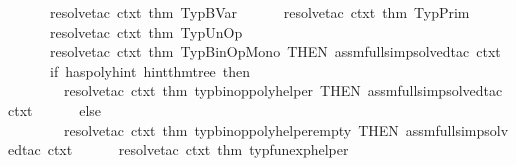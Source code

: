 \begin{isabellebody}
\ \ \ \ \ \ resolve{\isacharunderscore}{\kern0pt}tac\ ctxt\ {\isacharbrackleft}{\kern0pt}{\isacharat}{\kern0pt}{\isacharbraceleft}{\kern0pt}thm\ TypBVar{\isacharbraceright}{\kern0pt}{\isacharbrackright}{\kern0pt}{\isacharcomma}{\kern0pt}\isanewline
\ \ \ \ \ \ resolve{\isacharunderscore}{\kern0pt}tac\ ctxt\ {\isacharbrackleft}{\kern0pt}{\isacharat}{\kern0pt}{\isacharbraceleft}{\kern0pt}thm\ TypPrim{\isacharbraceright}{\kern0pt}{\isacharbrackright}{\kern0pt}{\isacharcomma}{\kern0pt}\isanewline
\ \ \ \ \ \ resolve{\isacharunderscore}{\kern0pt}tac\ ctxt\ {\isacharbrackleft}{\kern0pt}{\isacharat}{\kern0pt}{\isacharbraceleft}{\kern0pt}thm\ TypUnOp{\isacharbraceright}{\kern0pt}{\isacharbrackright}{\kern0pt}{\isacharcomma}{\kern0pt}\isanewline
\ \ \ \ \ \ resolve{\isacharunderscore}{\kern0pt}tac\ ctxt\ {\isacharbrackleft}{\kern0pt}{\isacharat}{\kern0pt}{\isacharbraceleft}{\kern0pt}thm\ TypBinOpMono{\isacharbraceright}{\kern0pt}{\isacharbrackright}{\kern0pt}\ THEN{\isacharprime}{\kern0pt}\ assm{\isacharunderscore}{\kern0pt}full{\isacharunderscore}{\kern0pt}simp{\isacharunderscore}{\kern0pt}solved{\isacharunderscore}{\kern0pt}tac\ ctxt{\isacharcomma}{\kern0pt}\isanewline
\ \ \ \ \ \ if\ has{\isacharunderscore}{\kern0pt}poly{\isacharunderscore}{\kern0pt}hint\ hint{\isacharunderscore}{\kern0pt}thm{\isacharunderscore}{\kern0pt}tree\ then\isanewline
\ \ \ \ \ \ \ \ resolve{\isacharunderscore}{\kern0pt}tac\ ctxt\ {\isacharbrackleft}{\kern0pt}{\isacharat}{\kern0pt}{\isacharbraceleft}{\kern0pt}thm\ typ{\isacharunderscore}{\kern0pt}binop{\isacharunderscore}{\kern0pt}poly{\isacharunderscore}{\kern0pt}helper{\isacharunderscore}{\kern0pt}{}{\isacharbraceright}{\kern0pt}{\isacharbrackright}{\kern0pt}\ THEN{\isacharprime}{\kern0pt}\ assm{\isacharunderscore}{\kern0pt}full{\isacharunderscore}{\kern0pt}simp{\isacharunderscore}{\kern0pt}solved{\isacharunderscore}{\kern0pt}tac\ ctxt\isanewline
\ \ \ \ \ \ else\ \isanewline
\ \ \ \ \ \ \ \ resolve{\isacharunderscore}{\kern0pt}tac\ ctxt\ {\isacharbrackleft}{\kern0pt}{\isacharat}{\kern0pt}{\isacharbraceleft}{\kern0pt}thm\ typ{\isacharunderscore}{\kern0pt}binop{\isacharunderscore}{\kern0pt}poly{\isacharunderscore}{\kern0pt}helper{\isacharunderscore}{\kern0pt}empty{\isacharbraceright}{\kern0pt}{\isacharbrackright}{\kern0pt}\ THEN{\isacharprime}{\kern0pt}\ assm{\isacharunderscore}{\kern0pt}full{\isacharunderscore}{\kern0pt}simp{\isacharunderscore}{\kern0pt}solved{\isacharunderscore}{\kern0pt}tac\ ctxt{\isacharcomma}{\kern0pt}\isanewline
\ \ \ \ \ \ resolve{\isacharunderscore}{\kern0pt}tac\ ctxt\ {\isacharbrackleft}{\kern0pt}{\isacharat}{\kern0pt}{\isacharbraceleft}{\kern0pt}thm\ typ{\isacharunderscore}{\kern0pt}funexp{\isacharunderscore}{\kern0pt}helper{\isacharbraceright}{\kern0pt}{\isacharbrackright}{\kern0pt}{\isacharcomma}{\kern0pt}\isanewline

\end{isabellebody}
